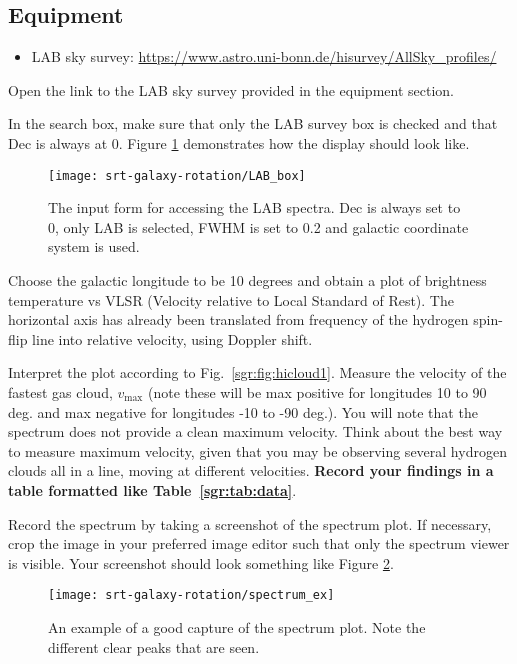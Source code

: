 \subsection{Equipment}
\begin{itemize}
	\item LAB sky survey: \url{https://www.astro.uni-bonn.de/hisurvey/AllSky_profiles/}
\end{itemize}

\begin{steps}

\item Open the link to the LAB sky survey provided in the equipment section.

\item In the search box, make sure that only the LAB survey box is checked and that Dec is always at 0. Figure \ref{sgr:fig:lab-box} demonstrates how the display should look like.

\begin{figure}
	\centering
	\texttt{[image: srt-galaxy-rotation/LAB\_box]}
	\caption{The input form for accessing the LAB spectra. Dec is always set to 0, only LAB is selected, FWHM is set to 0.2 and galactic coordinate system is used.} 
	\label{sgr:fig:lab-box}
\end{figure}

\item Choose the galactic longitude to be  10 degrees and obtain a plot of brightness temperature vs VLSR (Velocity relative to Local Standard of Rest). The horizontal axis has already been translated from frequency of the hydrogen spin-flip line into relative velocity, using Doppler shift.

\item Interpret the plot according to Fig.~\ref{sgr:fig:hicloud1}. Measure the velocity of the fastest gas cloud, $v_\textrm{max}$ (note these will be max positive for
longitudes 10 to 90 deg. and max negative for longitudes -10 to -90
deg.). You will note that the spectrum does not provide a clean
maximum velocity. Think about the best way to measure
maximum velocity, given that you may be observing several hydrogen clouds all in a line, moving at different velocities. \textbf{Record your findings in a table formatted like Table~\ref{sgr:tab:data}}.

\item Record the spectrum by taking a screenshot of the spectrum plot. If necessary, crop the image in your preferred image editor such that only the spectrum viewer is visible. Your screenshot should look something like Figure \ref{sgr:fig:spec-example}.
\end{steps}%
\begin{figure}
\centering
\texttt{[image: srt-galaxy-rotation/spectrum\_ex]}
\caption{An example of a good capture of the spectrum plot. Note the different clear peaks that are seen.} 
\label{sgr:fig:spec-example}
\end{figure}%

